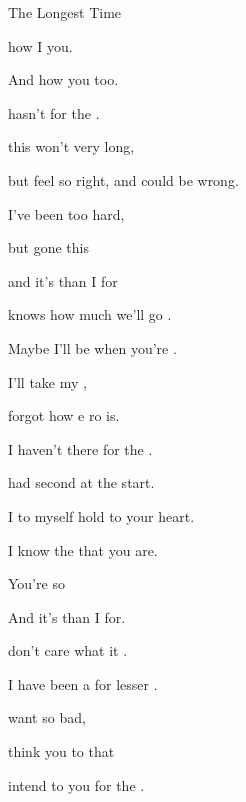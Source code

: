 \begin{SBSong}{The Longest Time}
\begin{SBVerse}
     how I  you. 

      And how you   too.

     hasn't  for the  .
  \end{SBVerse}
  \CBPageBrk
  \begin{SBVerse} 
     this won't  very long,  

    but  feel so right, and  could be wrong.
    
     I've been  too hard,
                                        
    but  gone this  

    and it's  than I  for
  \end{SBVerse}
  \begin{SBVerse} 
     knows how much  we'll go .  

    Maybe I'll be  when you're .

     I'll take my , 

     forgot how e ro is.

     I haven't  there for the  .
  \end{SBVerse}
  \begin{SBVerse} 
     had second  at the start.  

    I  to myself hold  to your heart.
          
     I know the  that you are.
                                      
    You're  so  

    And it's  than I  for.
  \end{SBVerse}
  \begin{SBVerse} 
     don't care what  it . 

    I have been a  for lesser .
    
     want  so bad, 

     think you  to  that
    
     intend to  you for the  .
  \end{SBVerse}
\end{SBSong}
